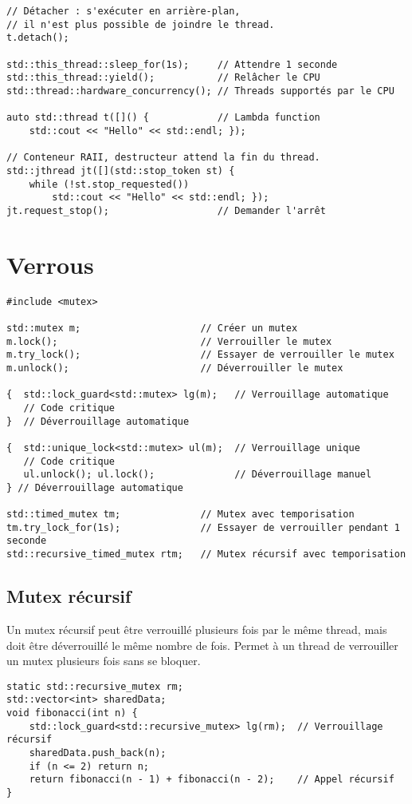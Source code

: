 \documentclass{article}
\begin{document}
\begin{multicols*}{3}
\begin{lstlisting}
// Détacher : s'exécuter en arrière-plan,
// il n'est plus possible de joindre le thread.
t.detach();

std::this_thread::sleep_for(1s);     // Attendre 1 seconde
std::this_thread::yield();           // Relâcher le CPU
std::thread::hardware_concurrency(); // Threads supportés par le CPU

auto std::thread t([]() {            // Lambda function
    std::cout << "Hello" << std::endl; });

// Conteneur RAII, destructeur attend la fin du thread.
std::jthread jt([](std::stop_token st) {
    while (!st.stop_requested())
        std::cout << "Hello" << std::endl; });
jt.request_stop();                   // Demander l'arrêt
\end{lstlisting}

\section*{Verrous}
\begin{lstlisting}
#include <mutex>

std::mutex m;                     // Créer un mutex
m.lock();                         // Verrouiller le mutex
m.try_lock();                     // Essayer de verrouiller le mutex
m.unlock();                       // Déverrouiller le mutex

{  std::lock_guard<std::mutex> lg(m);   // Verrouillage automatique
   // Code critique
}  // Déverrouillage automatique

{  std::unique_lock<std::mutex> ul(m);  // Verrouillage unique
   // Code critique
   ul.unlock(); ul.lock();              // Déverrouillage manuel
} // Déverrouillage automatique

std::timed_mutex tm;              // Mutex avec temporisation
tm.try_lock_for(1s);              // Essayer de verrouiller pendant 1 seconde
std::recursive_timed_mutex rtm;   // Mutex récursif avec temporisation
\end{lstlisting}

\subsection*{Mutex récursif}
Un mutex récursif peut être verrouillé plusieurs fois par le même thread, mais doit être déverrouillé le même nombre de fois. Permet à un thread de verrouiller un mutex plusieurs fois sans se bloquer.

\begin{lstlisting}
static std::recursive_mutex rm;
std::vector<int> sharedData;
void fibonacci(int n) {
    std::lock_guard<std::recursive_mutex> lg(rm);  // Verrouillage récursif
    sharedData.push_back(n);
    if (n <= 2) return n;
    return fibonacci(n - 1) + fibonacci(n - 2);    // Appel récursif
}
\end{lstlisting}


\end{multicols*}
\end{document}
